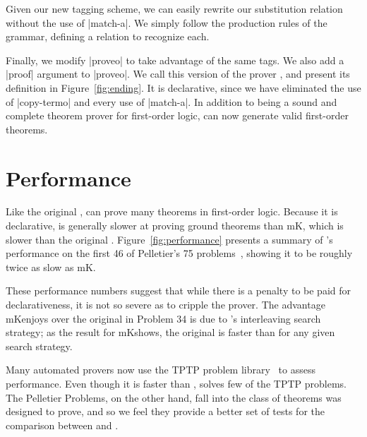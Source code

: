 Given our new tagging scheme, we can easily rewrite our substitution
relation without the use of \scheme|match-a|. We simply follow the
production rules of the grammar, defining a relation to recognize
each.

Finally, we modify \scheme|proveo| to take advantage of the same tags.
We also add a \scheme|proof| argument to \scheme|proveo|.  We call
this version of the prover \alphatap, and present its definition in
Figure~\ref{fig:ending}. It is declarative, since we have eliminated
the use of \scheme|copy-termo| and every use of \scheme|match-a|. In
addition to being a sound and complete theorem prover for first-order
logic, \alphatapsp can now generate valid first-order theorems.






\section{Performance}\label{performance}
\enlargethispage{1\baselineskip} %

Like the original \leantap, \alphatapsp can prove many theorems in
first-order logic. Because it is declarative, \alphatapsp is generally
slower at proving ground theorems than mK\leantap, which is slower
than the original \leantap. Figure~\ref{fig:performance} presents a
summary of \alphatap's performance on the first 46 of Pelletier's 75
problems~\cite{pelletier1986sfp}, showing it to be roughly twice as
slow as mK\leantap.

These performance numbers suggest that while there is a penalty to be
paid for declarativeness, it is not so severe as to cripple the
prover. The advantage mK\leantapsp enjoys over the original \leantapsp
in Problem 34 is due to \alphakanren's interleaving search strategy;
as the result for mK\leantapsp shows, the original \leantapsp is faster
than \alphatapsp for any given search strategy.

Many automated provers now use the TPTP problem
library~\cite{stucliffe1994tpl} to assess performance. Even though it
is faster than \alphatap, \leantapsp solves few of the TPTP
problems. The Pelletier Problems, on the other hand, fall into the
class of theorems \leantapsp was designed to prove, and so we feel
they provide a better set of tests for the comparison between
\leantapsp and \alphatap.

